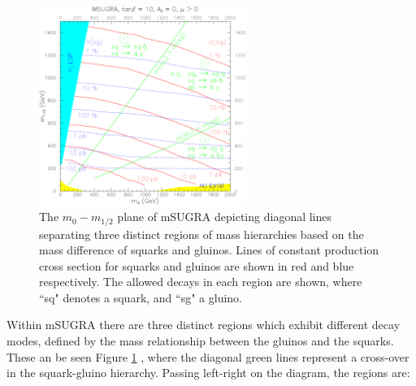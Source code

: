 \begin{figure}
\centering
\includegraphics[width=0.6\textwidth]{Figures/Theory/mSUGRA_TDR_1}
\caption[The $m_{0}-m_{1/2}$ plane of mSUGRA depicting diagonal lines separating three distinct regions of mass hierarchies based on the mass difference of squarks and gluinos. ]{\label{fig:msugratdr}The $m_{0}-m_{1/2}$ plane of mSUGRA depicting diagonal lines separating three distinct regions of mass hierarchies based on the mass difference of squarks and gluinos. Lines of constant production cross section for squarks and gluinos are shown in red and blue respectively. The allowed decays in each region are shown, where ``sq" denotes a squark, and ``sg" a gluino.\cite{CMSTDRII}}

\end{figure}

Within mSUGRA there are three distinct regions which exhibit different decay modes, defined by the mass relationship between the gluinos and the squarks. These an be seen Figure \ref{fig:msugratdr} , where the diagonal green lines represent a cross-over in the squark-gluino hierarchy. Passing left-right on the diagram, the regions are:

